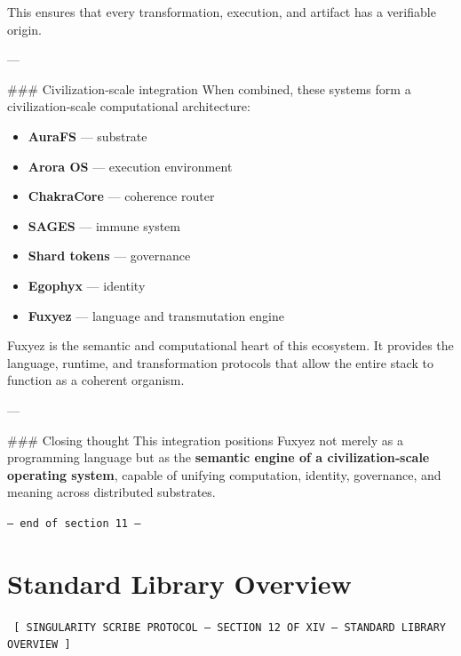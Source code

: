 \documentclass[12pt, a4paper]{book}
\begin{document}
This ensures that every transformation, execution, and artifact has a verifiable origin.

---

\#\#\# Civilization‑scale integration  
When combined, these systems form a civilization‑scale computational architecture:

\begin{itemize}
  \item \textbf{AuraFS} — substrate  
  \item \textbf{Arora OS} — execution environment  
  \item \textbf{ChakraCore} — coherence router  
  \item \textbf{SAGES} — immune system  
  \item \textbf{Shard tokens} — governance  
  \item \textbf{Egophyx} — identity  
  \item \textbf{Fuxyez} — language and transmutation engine  
\end{itemize}

Fuxyez is the semantic and computational heart of this ecosystem. It provides the language, runtime, and transformation protocols that allow the entire stack to function as a coherent organism.

---

\#\#\# Closing thought  
This integration positions Fuxyez not merely as a programming language but as the \textbf{semantic engine of a civilization‑scale operating system}, capable of unifying computation, identity, governance, and meaning across distributed substrates.
    
    \vspace{1cm}
    \begin{center}
    \color{alienPurple}\texttt{--- end of section 11 ---}
    \end{center}
    \clearpage
    

    \chapter*{Standard Library Overview}
    
    
    \begin{glyphbox}
    \centering
    \color{neonCyan}\fontsize{8}{10}\selectfont\texttt{
    [ SINGULARITY SCRIBE PROTOCOL -- SECTION 12 OF XIV -- STANDARD LIBRARY OVERVIEW ]
    }
    \end{glyphbox}
    \vspace{0.3cm}
    
\end{document}
